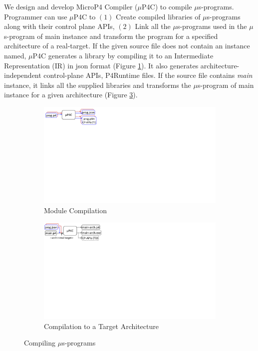 We design and develop MicroP4 Compiler ($\mu$P4C) to compile $\mu$s-programs.
Programmer can use $\mu$P4C to $(1)$ Create compiled libraries of $\mu$s-programs along with their control plane APIs, $(2)$ Link all the $\mu$s-programs used in the $\mu$s-program of main instance and transform the program for a specified architecture of a real-target.
If the given source file does not contain an instance named, $\mu$P4C generates a library by compiling it to an Intermediate Representation (IR) in json format (Figure \ref{subfig:module-compilation}).
It also generates architecture-independent control-plane APIs, P4Runtime \cite{p4runtime} files.
If the source file contains \emph{main} instance, it links all the supplied libraries and transforms the $\mu$s-program of main instance for a given architecture (Figure \ref{subfig:compilation-to-target-architecture}).
\begin{figure}[h]
    \begin{subfigure}{\linewidth}
        \centering
        \includegraphics[trim=10 440 666 0, clip,scale=0.5]{mp4c-frontend.pdf}
         \caption{Module Compilation}
         \label{subfig:module-compilation}
    \end{subfigure}
    \begin{subfigure}{\linewidth}
        \centering
        \includegraphics[trim=3 440 640 0, clip,scale=0.5]{mp4c-compiler}
        \caption{Compilation to a Target Architecture}
        \label{subfig:compilation-to-target-architecture}
    \end{subfigure}
    \caption{Compiling $\mu$s-programs}
\end{figure}
